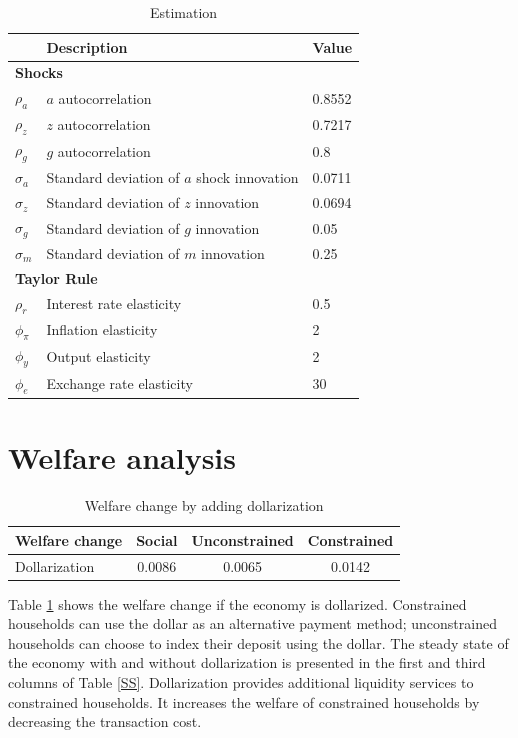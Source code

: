 \documentclass[12pt]{article}
\begin{document}
\begin{table}[h!]
\centering
\begin{tabular}{lll}
\hline\hline
& Description & Value \\\hline
\multicolumn{3}{l}{\bf Shocks}     \\                                                              
$\rho_a$      & $a$ autocorrelation    & 0.8552            \\
$\rho_z$       & $z$ autocorrelation     & 0.7217   	    \\
$\rho_g$     & $g$ autocorrelation & 0.8 \\
$\sigma_a$     & Standard deviation of $a$ shock innovation        & 0.0711   \\
$\sigma_z$     & Standard deviation of $z$ innovation   & 0.0694      \\
$\sigma_g$     &  Standard deviation of $g$  innovation & 0.05 \\
$\sigma_m$     & Standard deviation of $m$ innovation   & 0.25              \\
\multicolumn{3}{l}{\bf Taylor Rule}     \\ 
$\rho_r$     & Interest rate elasticity    & 0.5      	 \\
$\phi_{\pi}$    & Inflation elasticity       & 2      	\\
$\phi_y$       & Output elasticity           & 2    	\\
$\phi_e$       & Exchange rate elasticity          & 30      	\\\hline
\end{tabular}
\caption{Estimation}
\end{table}

\clearpage
\section{Welfare analysis}
\begin{table}[h!]
\centering
\begin{tabular}{lccc}
\hline\hline
Welfare change & Social  & Unconstrained & Constrained  \\\hline
Dollarization & 0.0086 &   0.0065  &  0.0142 \\\hline        
\end{tabular}
\caption{Welfare change by adding dollarization}
\label{Welfare1}
\end{table}
Table \ref{Welfare1} shows the welfare change if the economy is dollarized. Constrained households can use the dollar as an alternative payment method; unconstrained households can choose to index their deposit using the dollar. The steady state of the economy with and without dollarization is presented in the first and third columns of Table \ref{SS}. Dollarization provides additional liquidity services to constrained households. It increases the welfare of constrained households by decreasing the transaction cost. 
\end{document}
